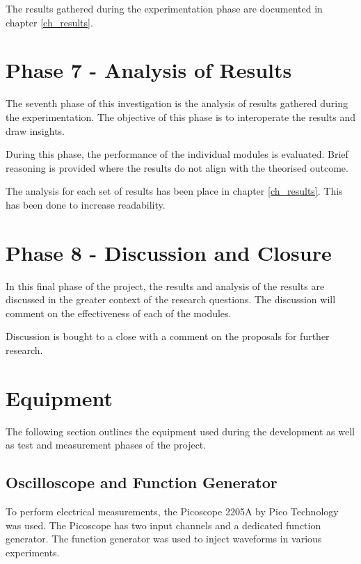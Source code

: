 The results gathered during the experimentation phase are documented in chapter \ref{ch_results}.


\section{Phase 7 - Analysis of Results}

The seventh phase of this investigation is the analysis of results gathered during the experimentation. The objective of this phase is to interoperate the results and draw insights.

During this phase, the performance of the individual modules is evaluated. Brief reasoning is provided where the results do not align with the theorised outcome.

The analysis for each set of results has been place in chapter \ref{ch_results}. This has been done to increase readability.



\section{Phase 8 - Discussion and Closure}

In this final phase of the project, the results and analysis of the results are discussed in the greater context of the research questions. The discussion will comment on the effectiveness of each of the modules. 

Discussion is bought to a close with a comment on the  proposals for further research.




\section{Equipment}
\label{sec:test_and_measurement_equipment}
The following section outlines the equipment used during the development as well as test and measurement phases of the project.

\subsection{Oscilloscope and Function Generator}
To perform electrical measurements, the Picoscope 2205A by Pico Technology was used. The Picoscope has two input channels and a dedicated function generator. The function generator was used to inject waveforms in various experiments.

